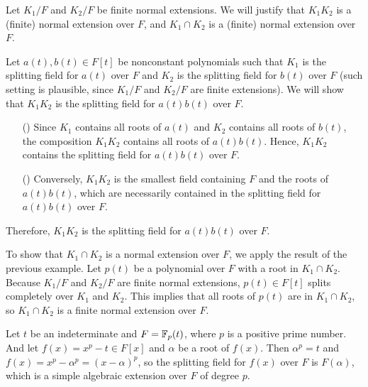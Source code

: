 \begin{exmp}
    Let $K_1/F$ and $K_2/F$ be finite normal extensions.
    We will justify that $K_1K_2$ is a (finite) normal extension over $F$, and $K_1\cap K_2$ is a (finite) normal extension over $F$.

    Let $a(t), b(t)\in F[t]$ be nonconstant polynomials such that $K_1$ is the splitting field for $a(t)$ over $F$ and $K_2$ is the splitting field for $b(t)$ over $F$ (such setting is plausible, since $K_1/F$ and $K_2/F$ are finite extensions).
    We will show that $K_1K_2$ is the splitting field for $a(t)b(t)$ over $F$.
    \begin{enumerate}
        \item[(\romannumeral 1)]
        {
            Since $K_1$ contains all roots of $a(t)$ and $K_2$ contains all roots of $b(t)$, the composition $K_1K_2$ contains all roots of $a(t)b(t)$.
            Hence, $K_1K_2$ contains the splitting field for $a(t)b(t)$ over $F$.
        }
        \item[(\romannumeral 2)]
        {
            Conversely, $K_1K_2$ is the smallest field containing $F$ and the roots of $a(t)b(t)$, which are necessarily contained in the splitting field for $a(t)b(t)$ over $F$.
        }
    \end{enumerate}
    Therefore, $K_1K_2$ is the splitting field for $a(t)b(t)$ over $F$.

    To show that $K_1\cap K_2$ is a normal extension over $F$, we apply the result of the previous example.
    Let $p(t)$ be a polynomial over $F$ with a root in $K_1\cap K_2$.
    Because $K_1/F$ and $K_2/F$ are finite normal extensions, $p(t)\in F[t]$ splits completely over $K_1$ and $K_2$.
    This implies that all roots of $p(t)$ are in $K_1\cap K_2$, so $K_1\cap K_2$ is a finite normal extension over $F$.
\end{exmp}

\begin{exmp}
    Let $t$ be an indeterminate and $F={\mathbb{F}}_p(t)$, where $p$ is a positive prime number.
    And let $f(x)=x^p-t\in F[x]$ and $\alpha$ be a root of $f(x)$.
    Then $\alpha^p=t$ and $f(x)=x^p-\alpha^p=(x-\alpha)^p$, so the splitting field for $f(x)$ over $F$ is $F(\alpha)$, which is a simple algebraic extension over $F$ of degree $p$.
\end{exmp}